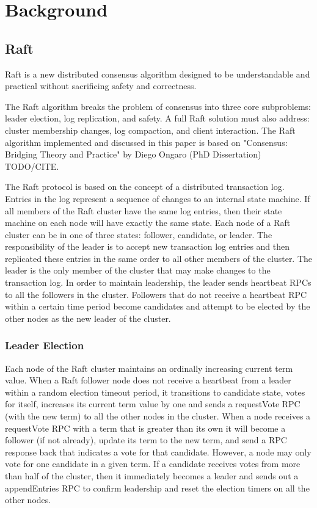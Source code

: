 \documentclass{acmtog} %
\begin{document}
\section{Background}

\subsection{Raft}

Raft is a new distributed consensus algorithm designed to be
understandable and practical without sacrificing safety and
correctness.

The Raft algorithm breaks the problem of consensus into three core
subproblems: leader election, log replication, and safety. A full Raft
solution must also address: cluster membership changes, log
compaction, and client interaction. The Raft algorithm implemented and
discussed in this paper is based on "Consensus: Bridging Theory and
Practice" by Diego Ongaro (PhD Dissertation) TODO/CITE.

The Raft protocol is based on the concept of a distributed transaction
log. Entries in the log represent a sequence of changes to an internal
state machine. If all members of the Raft cluster have the same log
entries, then their state machine on each node will have exactly the
same state. Each node of a Raft cluster can be in one of three states:
follower, candidate, or leader. The responsibility of the leader is to
accept new transaction log entries and then replicated these entries
in the same order to all other members of the cluster. The leader is
the only member of the cluster that may make changes to the
transaction log. In order to maintain leadership, the leader sends
heartbeat RPCs to all the followers in the cluster. Followers that
do not receive a heartbeat RPC within a certain time period become
candidates and attempt to be elected by the other nodes as the new
leader of the cluster.

\subsubsection{Leader Election}

Each node of the Raft cluster maintains an ordinally increasing
current term value. When a Raft follower node does not receive
a heartbeat from a leader within a random election timeout period, it
transitions to candidate state, votes for itself, increases its
current term value by one and sends a requestVote RPC (with the
new term) to all the other nodes in the cluster. When a node receives
a requestVote RPC with a term that is greater than its own it will
become a follower (if not already), update its term to the new term,
and send a RPC response back that indicates a vote for that candidate.
However, a node may only vote for one candidate in a given term. If
a candidate receives votes from more than half of the cluster, then it
immediately becomes a leader and sends out a appendEntries RPC to
confirm leadership and reset the election timers on all the other
nodes.
\end{document}
